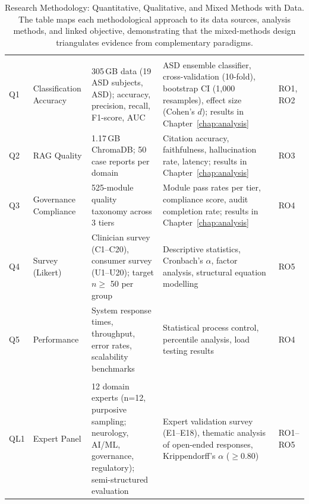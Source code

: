 {\tablestripes\tablefontsize
{}
\begin{xltabular}{\textwidth}{@{} >{\raggedright\arraybackslash}p{1.0cm} >{\raggedright\arraybackslash}p{2.0cm} p{4.7cm} p{5.0cm} >{\raggedright\arraybackslash}p{2.0cm} @{}}
\caption[Research Methodology: Quantitative, Qualitative, and]{Research Methodology: Quantitative, Qualitative, and Mixed Methods with Data. The table maps each methodological approach to its data sources, analysis methods, and linked objective, demonstrating that the mixed-methods design triangulates evidence from complementary paradigms.}\label{tab:research_approach} \\
\toprule
\thead{\#} &  &  &  &  \\
\midrule
\endfirsthead
\endhead
\bottomrule
\endlastfoot
{} \\
\addlinespace
Q1 & Classification Accuracy & 305\,GB data (19 ASD subjects, ASD); accuracy, precision, recall, F1-score, AUC & ASD ensemble classifier, cross-validation (10-fold), bootstrap CI (1,000 resamples), effect size (Cohen's $d$); results in Chapter~\ref{chap:analysis} & RO1, RO2 \\
\addlinespace
Q2 & RAG Quality & 1.17\,GB ChromaDB; 50 case reports per domain & Citation accuracy, faithfulness, hallucination rate, latency; results in Chapter~\ref{chap:analysis} & RO3 \\
\addlinespace
Q3 & Governance Compliance & 525-module quality taxonomy across 3 tiers & Module pass rates per tier, compliance score, audit completion rate; results in Chapter~\ref{chap:analysis} & RO4 \\
\addlinespace
Q4 & Survey (Likert) & Clinician survey (C1--C20), consumer survey (U1--U20); target $n \geq$ 50 per group & Descriptive statistics, Cronbach's $\alpha$, factor analysis, structural equation modelling & RO5 \\
\addlinespace
Q5 & Performance & System response times, throughput, error rates, scalability benchmarks & Statistical process control, percentile analysis, load testing results & RO4 \\
\midrule
{} \\
\addlinespace
QL1 & Expert Panel & 12 domain experts (n=12, purposive sampling; neurology, AI/ML, governance, regulatory); semi-structured evaluation & Expert validation survey (E1--E18), thematic analysis of open-ended responses, Krippendorff's $\alpha$ ($\geq$0.80) & RO1--RO5 \\

\end{xltabular}}
